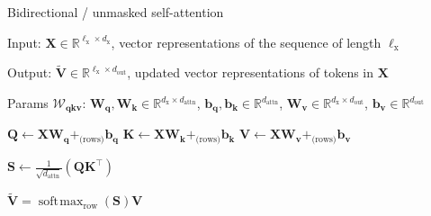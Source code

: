 \documentclass[12pt,aspectratio=169,handout]{beamer}
\DeclareMathOperator*{\softmax}{soft\!\max}
\begin{document}
\begin{frame}{Bidirectional / unmasked self-attention}
	
\begin{minipage}[t][10cm][t]{15cm}

Input: $\bm{X} \in \mathbb{R}^{\ell_{\text{x}} \times d_{\text{x}}}$, vector representations of the sequence of length $\ell_{\text{x}}$

Output: $\bm{\tilde{V}} \in \mathbb{R}^{\ell_{\text{x}} \times d_{\text{out}}}$, updated vector representations of tokens in $\bm{X}$

Params $\bm{\mathcal{W}_{qkv}}$: $\bm{W_q}, \bm{W_k} \in \mathbb{R}^{d_\text{x} \times d_\text{attn}}$, $\bm{b_q}, \bm{b_k} \in \mathbb{R}^{d_\text{attn}}$, $\bm{W_v} \in \mathbb{R}^{d_\text{x} \times d_\text{out}}$, $ \bm{b_v} \in \mathbb{R}^{d_\text{out}}$

\begin{algorithmic}[1]
\State $\bm{Q} \gets \bm{X} \bm{W_q} +_{\text{(rows)}} \bm{b_q}$
\State $\bm{K} \gets \bm{X} \bm{W_k} +_{\text{(rows)}} \bm{b_k}$
\State $\bm{V} \gets \bm{X} \bm{W_v} +_{\text{(rows)}} \bm{b_v}$

\State $\bm{S} \gets \frac{1}{\sqrt{d_{\text{attn}}}} (\bm{Q} \bm{K}^\top)$

\State \Return $\bm{\tilde V} = \softmax_{\text{row}}(\bm{S}) \bm{V}$

\EndFunction
\end{algorithmic}

\end{minipage}
\end{frame}
\end{document}
